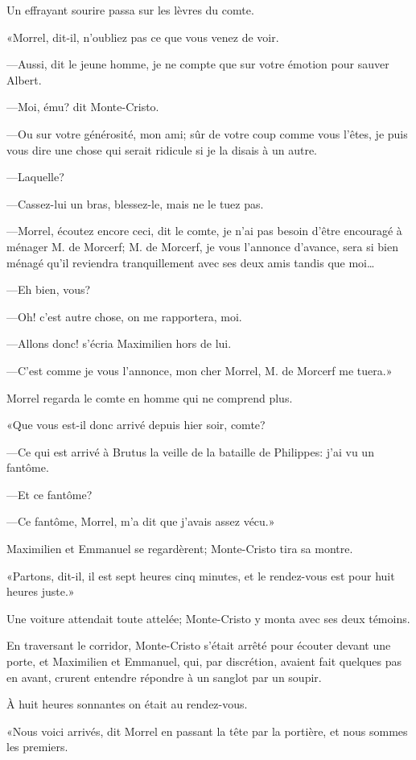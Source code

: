 Un effrayant sourire passa sur les lèvres du comte. 

«Morrel, dit-il, n'oubliez pas ce que vous venez de voir. 

—Aussi, dit le jeune homme, je ne compte que sur votre émotion pour sauver Albert. 

—Moi, ému? dit Monte-Cristo. 

—Ou sur votre générosité, mon ami; sûr de votre coup comme vous l'êtes, je puis vous dire une chose qui serait ridicule si je la disais à un autre. 

—Laquelle? 

—Cassez-lui un bras, blessez-le, mais ne le tuez pas. 

—Morrel, écoutez encore ceci, dit le comte, je n'ai pas besoin d'être encouragé à ménager M. de Morcerf; M. de Morcerf, je vous l'annonce d'avance, sera si bien ménagé qu'il reviendra tranquillement avec ses deux amis tandis que moi\dots 

—Eh bien, vous? 

—Oh! c'est autre chose, on me rapportera, moi. 

—Allons donc! s'écria Maximilien hors de lui. 

—C'est comme je vous l'annonce, mon cher Morrel, M. de Morcerf me tuera.» 

Morrel regarda le comte en homme qui ne comprend plus. 

«Que vous est-il donc arrivé depuis hier soir, comte? 

—Ce qui est arrivé à Brutus la veille de la bataille de Philippes: j'ai vu un fantôme. 

—Et ce fantôme? 

—Ce fantôme, Morrel, m'a dit que j'avais assez vécu.» 

Maximilien et Emmanuel se regardèrent; Monte-Cristo tira sa montre. 

«Partons, dit-il, il est sept heures cinq minutes, et le rendez-vous est pour huit heures juste.» 

Une voiture attendait toute attelée; Monte-Cristo y monta avec ses deux témoins. 

En traversant le corridor, Monte-Cristo s'était arrêté pour écouter devant une porte, et Maximilien et Emmanuel, qui, par discrétion, avaient fait quelques pas en avant, crurent entendre répondre à un sanglot par un soupir. 

À huit heures sonnantes on était au rendez-vous. 

«Nous voici arrivés, dit Morrel en passant la tête par la portière, et nous sommes les premiers. 

